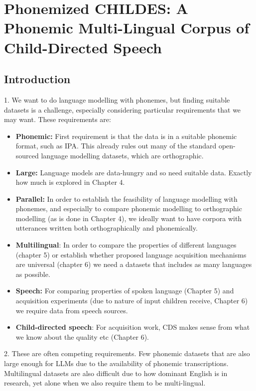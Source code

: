 \chapter{Phonemized CHILDES: A Phonemic Multi-Lingual Corpus of Child-Directed Speech}


\section{Introduction}
\label{sec:dataset-intro}

\begin{roughdraft}
1. We want to do language modelling with phonemes, but finding suitable datasets is a challenge, especially considering particular requirements that we may want. These requirements are:
\begin{itemize}
    \item \textbf{Phonemic:} First requirement is that the data is in a suitable phonemic format, such as IPA. This already rules out many of the standard open-sourced language modelling datasets, which are orthographic.
    \item \textbf{Large:} Language models are data-hungry and so need suitable data. Exactly how much is explored in Chapter 4.
    \item \textbf{Parallel:} In order to establish the feasibility of language modelling with phonemes, and especially to compare phonemic modelling to orthographic modelling (as is done in Chapter 4), we ideally want to have corpora with utterances written both orthographically and phonemically.
    \item \textbf{Multilingual}: In order to compare the properties of different languages (chapter 5) or establish whether proposed language acquisition mechanisms are universal (chapter 6) we need a datasets that includes as many languages as possible.
    \item \textbf{Speech:} For comparing properties of spoken language (Chapter 5) and acquisition experiments (due to nature of input children receive, Chapter 6) we require data from speech sources.
    \item \textbf{Child-directed speech}: For acquisition work, CDS makes sense from what we know about the quality etc (Chapter 6). 
\end{itemize}

2. These are often competing requirements. Few phonemic datasets that are also large enough for LLMs due to the availability of phonemic transcriptions. Multilingual datasets are also difficult due to how dominant English is in research, yet alone when we also require them to be multi-lingual. 


\end{roughdraft}
